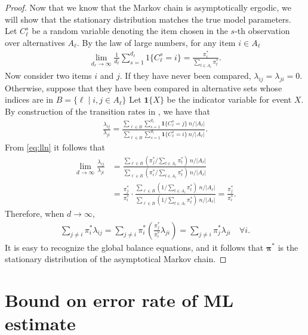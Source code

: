 \begin{proof}
Now that we know that the Markov chain is asymptotically ergodic, we will show that the stationary distribution matches the true model parameters.
Let $C_\ell^s$ be a random variable denoting the item chosen in the $s$-th observation over alternatives $A_\ell$.
By the law of large numbers, for any item $i \in A_\ell$
\begin{align}
\label{eq:lln}
\lim_{d_\ell \to \infty} \frac{1}{d_\ell} \sum_{s = 1}^{d_\ell} 1\{C_\ell^s = i\} = \frac{\pi^*_i}{\sum_{t \in A_\ell} \pi^*_t}.
\end{align}
Now consider two items $i$ and $j$.
If they have never been compared, $\lambda_{ij} = \lambda_{ji} = 0$.
Otherwise, suppose that they have been compared in alternative sets whose indices are in $B = \{ \ell \mid i, j \in A_\ell \}$
Let $\mathbf{1}\{X\}$ be the indicator variable for event $X$.
By construction of the transition rates in \LSR{}, we have that
\begin{align}
\label{eq:ratio}
\frac{\lambda_{ij}}{\lambda_{ji}}
= \frac{\sum_{\ell \in B} \sum_{s = 1}^{d_\ell} \mathbf{1}\{C_\ell^s = j\} \ n / |A_\ell|}
       {\sum_{\ell \in B} \sum_{s = 1}^{d_\ell} \mathbf{1}\{C_\ell^s = i\} \ n / |A_\ell|}.
\end{align}
From \eqref{eq:lln} it follows that
\begin{align}
\lim_{d \to \infty}\frac{\lambda_{ij}}{\lambda_{ji}}
& = \frac{\sum_{\ell \in B} (\pi^*_j / \sum_{t \in A_\ell} \pi^*_t) \ n / |A_\ell|}
         {\sum_{\ell \in B} (\pi^*_i / \sum_{t \in A_\ell} \pi^*_t) \ n / |A_\ell|} \\
& = \frac{\pi^*_j }{\pi^*_i}
    \cdot \frac{\sum_{\ell \in B}(1 / \sum_{t \in A_\ell} \pi^*_t) \ n / |A_\ell|}
               {\sum_{\ell \in B}(1 / \sum_{t \in A_\ell} \pi^*_t) \ n / |A_\ell|}
  = \frac{\pi^*_j}{\pi^*_i}.
\end{align}
Therefore, when $d \to \infty$,
\begin{align}
\sum_{j \ne i} \pi^*_i \lambda_{ij} = \sum_{j \ne i} \pi^*_i \left( \frac{\pi^*_j}{\pi^*_i} \lambda_{ji} \right)
                                    = \sum_{j \ne i} \pi^*_j \lambda_{ji}  \quad \forall i.
\end{align}
It is easy to recognize the global balance equations, and it follows that $\bm{\pi}^*$ is the stationary distribution of the asymptotical Markov chain.
\end{proof}


\section{Bound on error rate of ML estimate}


